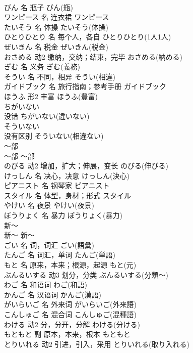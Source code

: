 \documentclass[8pt]{extreport}
\begin{document}
\begin{CJK}{UTF8}{min}
\\	びん	名	瓶子	びん(瓶)	
\\	ワンピース	名	连衣裙	ワンピース	
\\	たいそう	名	体操	たいそう(体操)	
\\	ひとりひとり	名	每个人，各自	ひとりひとり(1人1人)	
\\	ぜいきん	名	税金	ぜいきん(税金)	
\\	おさめる	动2	缴纳，交纳；结束，完毕	おさめる(納める)	
\\	ぎむ	名	义务	ぎむ(義務)	
\\	そうい	名	不同，相异	そうい(相違)	
\\	ガイドブック	名	旅行指南；参考手册	ガイドブック	
\\	ほうふ	形2	丰富	ほうふ(豊富)	
\\	ちがいない	
\\	没错	ちがいない(違いない)	
\\	そういない	
\\	没有区别	そういない(相違ない)	
\\	～部	
\\	～部	～部	
\\	のびる	动2	增加，扩大；伸展，变长	のびる(伸びる)	
\\	けっしん	名	决心，决意	けっしん(決心)	
\\	ピアニスト	名	钢琴家	ピアニスト	
\\	スタイル	名	体型，身材；形式	スタイル	
\\	やけい	名	夜景	やけい(夜景)	
\\	ぼうりょく	名	暴力	ぼうりょく(暴力)	
\\	新～	
\\	新～	新～	
\\	ごい	名	词，词汇	ごい(語彙)	
\\	たんご	名	词汇，单词	たんご(単語)	
\\	もと	名	原来，本来；根源，起源	もと(元)	
\\	ぶんるいする	动3	划分，分类	ぶんるいする(分類～)	
\\	わご	名	和语词	わご(和語)	
\\	かんご	名	汉语词	かんご(漢語)	
\\	がいらいご	名	外来词	がいらいご(外来語)	
\\	こんしゅご	名	混合词	こんしゅご(混種語)	
\\	わける	动2	分，分开，分解	わける(分ける)	
\\	もともと	副	原本，本来，根本	もともと	
\\	とりいれる	动2	引进，引入，采用	とりいれる(取り入れる)	

\end{CJK}
\end{document}
